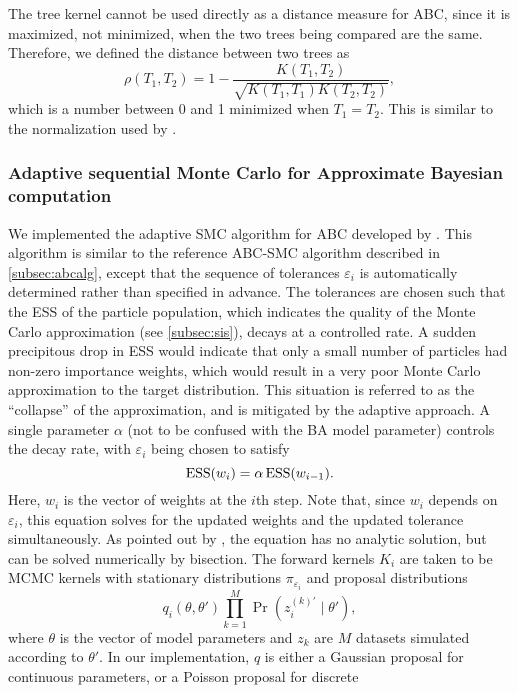 The tree kernel cannot be used directly as a distance measure for \gls{ABC},
since it is maximized, not minimized, when the two trees being compared are the
same. Therefore, we defined the distance between two trees as
\[
  \rho(T_1, T_2) = 1 - \frac{K(T_1, T_2)}{\sqrt{K(T_1, T_1) K(T_2, T_2)}},
\]
which is a number between 0 and 1 minimized when $T_1 = T_2$. This is similar
to the normalization used by \textcite{collins2002new, poon2013mapping}.

\subsubsection*{Adaptive sequential Monte Carlo for Approximate Bayesian computation}
\label{subsubsec:adaptsmc}

We implemented the adaptive \gls{SMC} algorithm for \gls{ABC} developed by
\textcite{del2012adaptive}. This algorithm is similar to the reference
\gls{ABC}-\gls{SMC} algorithm described in \cref{subsec:abcalg}, except that
the sequence of tolerances $\varepsilon_i$ is automatically determined rather
than specified in advance. The tolerances are chosen such that the \gls{ESS} of
the particle population, which indicates the quality of the Monte Carlo
approximation (see \cref{subsec:sis}), decays at a controlled rate. A
sudden precipitous drop in \gls{ESS} would indicate that only a small number of
particles had non-zero importance weights, which would result in a very poor
Monte Carlo approximation to the target distribution. This situation is
referred to as the ``collapse'' of the approximation, and is mitigated by the
adaptive approach. A single parameter $\alpha$ (not to be confused with the
\gls{BA} model parameter) controls the decay rate, with $\varepsilon_i$ being
chosen to satisfy
\[
  \operatorname{ESS}(w_i) = \alpha \operatorname{ESS}(w_{i-1}).
\]
Here, $w_i$ is the vector of weights at the $i$th step. Note that, since $w_i$
depends on $\varepsilon_i$, this equation solves for the updated weights and
the updated tolerance simultaneously. As pointed out by
\textcite{del2012adaptive}, the equation has no analytic solution, but can be
solved numerically by bisection. The forward kernels $K_i$ are taken to be
\gls{MCMC} kernels with stationary distributions $\pi_{\varepsilon_i}$ and
proposal distributions
\[
  q_i(\theta, \theta') \prod_{k=1}^M \Pr(z_i^{(k)'} \mid \theta'),
\]
where $\theta$ is the vector of model parameters and $z_k$ are $M$ datasets
simulated according to $\theta'$. In our implementation, $q$ is either a
Gaussian proposal for continuous parameters, or a Poisson proposal for discrete
